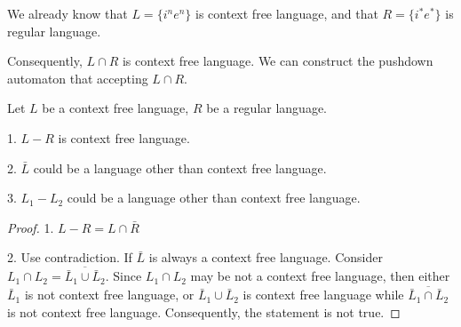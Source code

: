 \documentclass[../main]{subfiles}
\begin{document}
\begin{exam}
	We already know that \(L  =  \{   i ^{n}  e ^{n}  \}\) is context free language, and that \( R  = \{  i ^{*}  e ^{*}\}\) is 
	regular language. 

	Consequently, \( L \cap R  \) is context free language. We can construct the pushdown automaton that accepting \(L \cap R\). 
\end{exam}

\begin{thm}
\label{Other closure properties}
Let \(L \) be a context free language, \(R\) be a regular language. 

\medskip
	\setlength{\hangindent}{33pt}
	1. \( L - R\) is context free language. 
	\smallskip

	2. \( \bar L \) could be a language other than context free language. 
	\smallskip

	3. \(L_1 - L_2\) could be a language other than context free 
language. 
\end{thm}

\begin{proof}
1. \(L - R = L \cap \bar R\)
\smallskip

	2. Use contradiction. If \(\bar L \) is always a context free language. 
	Consider \( L_1 \cap  L_2 = \overline{\bar L_1 \cup \bar L_2}\). Since \(L_1 \cap L_2\) may be not a context free language, 
	then either \(\bar L_1\) is not context free language, or 
	\(\bar L_1 \cup \bar L_2\) is context free language while 
	\( \overline {\bar L_1 \cap \bar L_2}\) is not context free 
	language. 
	Consequently, the statement is not true.
\end{proof}

\end{document}
